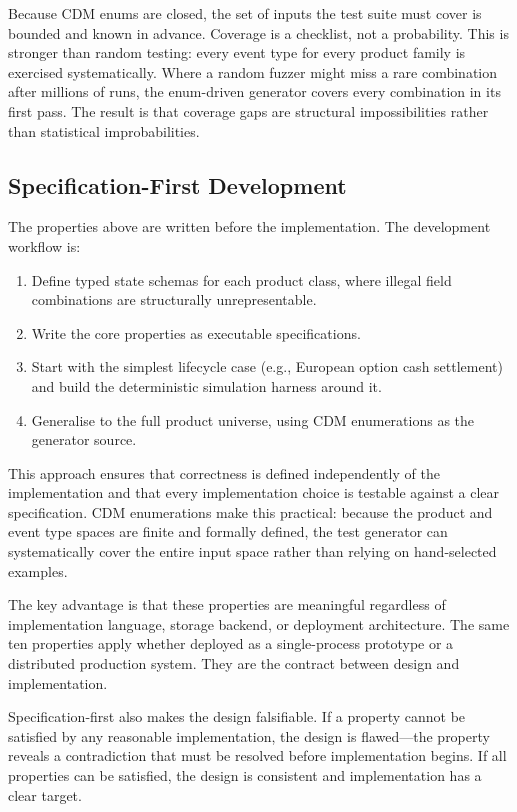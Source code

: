 \documentclass[11pt,a4paper]{article}
\begin{document}
Because CDM enums are closed, the set of inputs the test suite must cover is bounded and known in advance. Coverage is a checklist, not a probability. This is stronger than random testing: every event type for every product family is exercised systematically. Where a random fuzzer might miss a rare combination after millions of runs, the enum-driven generator covers every combination in its first pass. The result is that coverage gaps are structural impossibilities rather than statistical improbabilities.

\subsection{Specification-First Development}

The properties above are written before the implementation. The development workflow is:

\begin{enumerate}[nosep]
\item Define typed state schemas for each product class, where illegal field combinations are structurally unrepresentable.
\item Write the core properties as executable specifications.
\item Start with the simplest lifecycle case (e.g., European option cash settlement) and build the deterministic simulation harness around it.
\item Generalise to the full product universe, using CDM enumerations as the generator source.
\end{enumerate}

This approach ensures that correctness is defined independently of the implementation and that every implementation choice is testable against a clear specification. CDM enumerations make this practical: because the product and event type spaces are finite and formally defined, the test generator can systematically cover the entire input space rather than relying on hand-selected examples.

The key advantage is that these properties are meaningful regardless of implementation language, storage backend, or deployment architecture. The same ten properties apply whether deployed as a single-process prototype or a distributed production system. They are the contract between design and implementation.

Specification-first also makes the design falsifiable. If a property cannot be satisfied by any reasonable implementation, the design is flawed---the property reveals a contradiction that must be resolved before implementation begins. If all properties can be satisfied, the design is consistent and implementation has a clear target.
\end{document}
